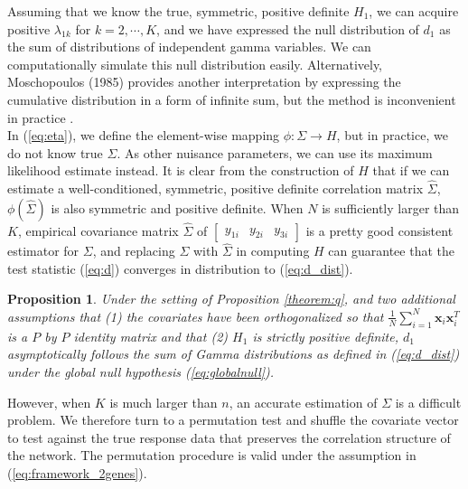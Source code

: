 \documentclass[aap, preprint]{imsart}
\numberwithin{equation}{section}
\theoremstyle{plain}
\newtheorem{prop}{Proposition}
\begin{document}
Assuming that we know the true, symmetric, positive definite $H_1$, we can acquire positive $\lambda_{1k}$ for $k = 2, \cdots, K$, and we have expressed the null distribution of $d_1$ as the sum of distributions of independent gamma variables. We can computationally simulate this null distribution easily. Alternatively, Moschopoulos (1985) provides another interpretation by expressing the cumulative distribution in a form of infinite sum, but the method is inconvenient in practice \cite{moschopoulos1985distribution}.\\

In (\ref{eq:eta}), we define the element-wise mapping $\phi: \Sigma \rightarrow H$, but in practice, we do not know true $\Sigma$. As other nuisance parameters, we can use its maximum likelihood estimate instead. It is clear from the construction of $H$ that if we can estimate a well-conditioned, symmetric, positive definite correlation matrix $\hat{\Sigma}$, $\phi(\hat{\Sigma})$ is also symmetric and positive definite. When $N$ is sufficiently larger than $K$, empirical covariance matrix $\hat{\Sigma}$ of $\begin{bmatrix} y_{1i} & y_{2i} & y_{3i} \end{bmatrix}$ is a pretty good consistent estimator for $\Sigma$, and replacing $\Sigma$ with $\hat{\Sigma}$ in computing $H$ can guarantee that the test statistic (\ref{eq:d}) converges in distribution to (\ref{eq:d_dist}). 

\begin{prop}
Under the setting of Proposition \ref{theorem:q}, and two additional assumptions that (1) the covariates have been orthogonalized so that 
$\frac{1}{N} \sum_{i=1}^{N} \bm{x}_i \bm{x}_i^T$ is a $P$ by $P$ identity matrix and that (2) $H_1$ is strictly positive definite, $d_1$ asymptotically follows the sum of Gamma distributions as defined in (\ref{eq:d_dist}) under the global null hypothesis (\ref{eq:globalnull}). 
\end{prop}

However, when $K$ is much larger than $n$, an accurate estimation of $\Sigma$ is a difficult problem. We therefore turn to a permutation test and shuffle the covariate vector to test against the true response data that preserves the correlation structure of the network. The permutation procedure is valid under the assumption in (\ref{eq:framework_2genes}). \\
\end{document}
